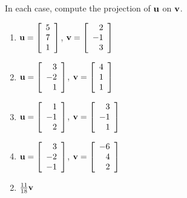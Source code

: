 \begin{multicols}{2}
\begin{ex}
In each case, compute the projection of $\textbf{u}$ on $\textbf{v}$.


\begin{enumerate}[label={\alph*.}]
\item $\textbf{u} = \left[
\begin{array}{r}
5\\
7\\
1
\end{array}
\right]$, 
$\textbf{v} = \left[
\begin{array}{r}
2\\
-1\\
3
\end{array}
\right]
$

\item $\textbf{u} = \left[
\begin{array}{r}
3\\
-2\\
1
\end{array}
\right]$, 
$\textbf{v} = \left[
\begin{array}{r}
4\\
1\\
1
\end{array}
\right]
$

\item $\textbf{u} = \left[
\begin{array}{r}
1\\
-1\\
2
\end{array}
\right]$, 
$\textbf{v} = \left[
\begin{array}{r}
3\\
-1\\
1
\end{array}
\right]
$

\item $\textbf{u} = \left[
\begin{array}{r}
3\\
-2\\
-1
\end{array}
\right]$, 
$\textbf{v} = \left[
\begin{array}{r}
-6\\
4\\
2
\end{array}
\right]
$

\end{enumerate}
\begin{sol}
\begin{enumerate}[label={\alph*.}]
\setcounter{enumi}{1}
\item  $\tfrac{11}{18}\textbf{v}$


\end{enumerate}
\end{sol}
\end{ex}
\end{multicols}
